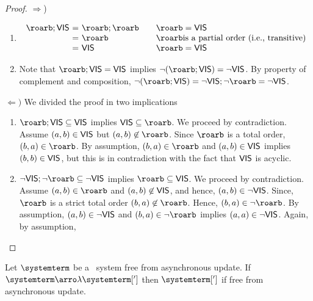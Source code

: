 \begin{proof} $\Rightarrow$) 
\begin{enumerate}
\item
	\[ \begin{array}{l@{\ =\ }l@{\qquad}l}
		\roarb;\ovis &  \roarb;\roarb & \roarb =\ovis\\
		& \roarb & \roarb \mbox{is a partial order (i.e., transitive)}\\
		&  \ovis & \roarb =\ovis
   	\end{array}
	\]
\item Note that  $\roarb;\ovis =\ovis$ implies $\neg(\roarb;\ovis) =\neg\ovis$. By property of complement and composition, $\neg(\roarb;\ovis) =\neg\ovis;\neg\roarb =\neg\ovis$. 
\end{enumerate}

$\Leftarrow)$ We divided the proof in two implications
 \begin{enumerate}
    \item  $\roarb;\ovis \subseteq \ovis$ implies $\ovis\subseteq \roarb$. We proceed by contradiction. Assume $(a,b)\in\mathsf{\scriptsize{VIS}}$ but $(a,b)\not\in\roarb$.
    Since $\roarb$ is a total order, $(b,a)\in\roarb$. By assumption, $(b,a)\in\roarb$ and $(a,b)\in\mathsf{\scriptsize{VIS}}$ implies $(b,b)\in\mathsf{\scriptsize{VIS}}$, but this is in contradiction 
    with the fact that $\mathsf{\scriptsize{VIS}}$ is acyclic. 
        
    \item $\neg\ovis;\neg\roarb \subseteq \neg\ovis$ implies $\roarb\subseteq\ovis$. We proceed by contradiction. 
    Assume $(a,b)\in\roarb$ and $(a,b)\not\in\mathsf{\scriptsize{VIS}}$, and hence,  $(a,b)\in\neg\mathsf{\scriptsize{VIS}}$. Since,
    $\roarb$ is a strict total order $(b,a)\not\in\roarb$. Hence, $(b,a)\in\neg\roarb$. By assumption, $(a,b)\in\neg\mathsf{\scriptsize{VIS}}$ and $(b,a)\in\neg\roarb$ implies $(a,a)\in\neg\mathsf{\scriptsize{VIS}}$.
    Again, by assumption, 
 \end{enumerate}

\end{proof}

	


\begin{lemma}\label{lemma:empty_queue} 
Let $\systemterm$  be a \gsp\ system free from asynchronous update. If $\systemterm\arroi{\lambda}\systemterm[']$ 
then $\systemterm[']$ if free from asynchronous update. 
\end{lemma}


